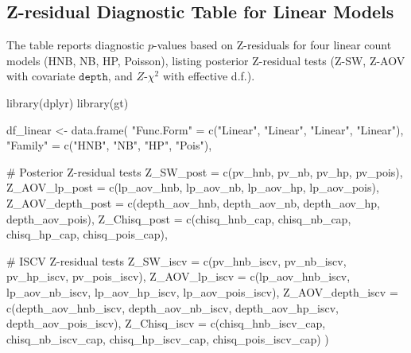\documentclass[
  english,
  letterpaper,
  DIV=11,
  numbers=noendperiod]{scrartcl}
\newenvironment{Shaded}{\begin{snugshade}}{\end{snugshade}}
\newcommand{\AttributeTok}[1]{\textcolor[rgb]{0.40,0.45,0.13}{#1}}
\newcommand{\CommentTok}[1]{\textcolor[rgb]{0.37,0.37,0.37}{#1}}
\newcommand{\FunctionTok}[1]{\textcolor[rgb]{0.28,0.35,0.67}{#1}}
\newcommand{\NormalTok}[1]{\textcolor[rgb]{0.00,0.23,0.31}{#1}}
\newcommand{\OtherTok}[1]{\textcolor[rgb]{0.00,0.23,0.31}{#1}}
\newcommand{\StringTok}[1]{\textcolor[rgb]{0.13,0.47,0.30}{#1}}
\begin{document}
\subsection{Z-residual Diagnostic Table for Linear
Models}\label{z-residual-diagnostic-table-for-linear-models}

The table reports diagnostic \(p\)-values based on Z-residuals for four
linear count models (HNB, NB, HP, Poisson), listing posterior Z-residual
tests (Z-SW, Z-AOV with covariate \(\texttt{depth}\), and
\(Z\)-\(\chi^2\) with effective d.f.).

\begin{Shaded}
\begin{Highlighting}[]
\FunctionTok{library}\NormalTok{(dplyr)}
\FunctionTok{library}\NormalTok{(gt)}

\NormalTok{df\_linear }\OtherTok{\textless{}{-}} \FunctionTok{data.frame}\NormalTok{(}
  \StringTok{"Func.Form"} \OtherTok{=} \FunctionTok{c}\NormalTok{(}\StringTok{"Linear"}\NormalTok{, }\StringTok{"Linear"}\NormalTok{, }\StringTok{"Linear"}\NormalTok{, }\StringTok{"Linear"}\NormalTok{),}
  \StringTok{"Family"}    \OtherTok{=} \FunctionTok{c}\NormalTok{(}\StringTok{"HNB"}\NormalTok{, }\StringTok{"NB"}\NormalTok{, }\StringTok{"HP"}\NormalTok{, }\StringTok{"Pois"}\NormalTok{),}

  \CommentTok{\# Posterior Z{-}residual tests}
  \AttributeTok{Z\_SW\_post        =} \FunctionTok{c}\NormalTok{(pv\_hnb, pv\_nb, pv\_hp, pv\_pois),}
  \AttributeTok{Z\_AOV\_lp\_post    =} \FunctionTok{c}\NormalTok{(lp\_aov\_hnb, lp\_aov\_nb, lp\_aov\_hp, lp\_aov\_pois),}
  \AttributeTok{Z\_AOV\_depth\_post =} \FunctionTok{c}\NormalTok{(depth\_aov\_hnb, depth\_aov\_nb, depth\_aov\_hp, depth\_aov\_pois),}
  \AttributeTok{Z\_Chisq\_post     =} \FunctionTok{c}\NormalTok{(chisq\_hnb\_cap, chisq\_nb\_cap, chisq\_hp\_cap, chisq\_pois\_cap),}

  \CommentTok{\# ISCV Z{-}residual tests}
  \AttributeTok{Z\_SW\_iscv        =} \FunctionTok{c}\NormalTok{(pv\_hnb\_iscv, pv\_nb\_iscv, pv\_hp\_iscv, pv\_pois\_iscv),}
  \AttributeTok{Z\_AOV\_lp\_iscv    =} \FunctionTok{c}\NormalTok{(lp\_aov\_hnb\_iscv, lp\_aov\_nb\_iscv, lp\_aov\_hp\_iscv, lp\_aov\_pois\_iscv),}
  \AttributeTok{Z\_AOV\_depth\_iscv =} \FunctionTok{c}\NormalTok{(depth\_aov\_hnb\_iscv, depth\_aov\_nb\_iscv, depth\_aov\_hp\_iscv, depth\_aov\_pois\_iscv),}
  \AttributeTok{Z\_Chisq\_iscv     =} \FunctionTok{c}\NormalTok{(chisq\_hnb\_iscv\_cap, chisq\_nb\_iscv\_cap, chisq\_hp\_iscv\_cap, chisq\_pois\_iscv\_cap)}
\NormalTok{)}


\end{Highlighting}
\end{Shaded}
\end{document}
